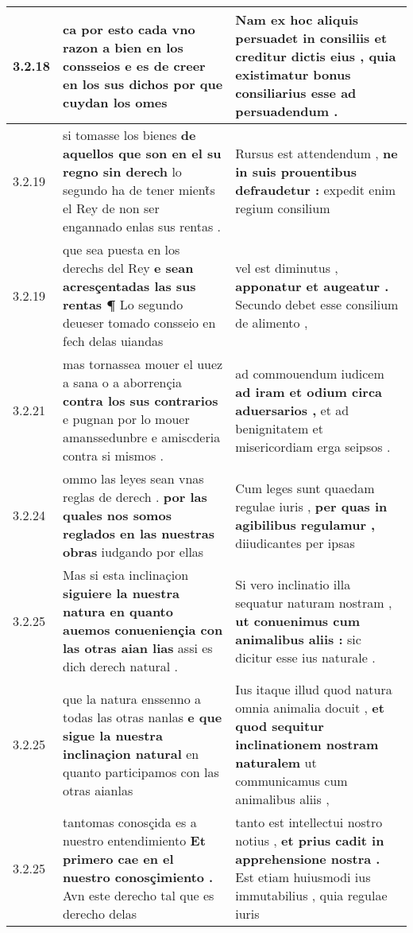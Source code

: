 \begin{tabular}{|p{1cm}|p{6.5cm}|p{6.5cm}|}
3.2.18 & ca por esto cada vno razon a bien en los consseios \textbf{ e es de creer en los sus dichos } por que cuydan los omes & Nam ex hoc aliquis persuadet in consiliis \textbf{ et creditur dictis eius , } quia existimatur bonus consiliarius esse ad persuadendum . \\\hline
3.2.19 & si tomasse los bienes \textbf{ de aquellos que son en el su regno sin derech } lo segundo ha de tener mient̃s el Rey de non ser engannado enlas sus rentas . & Rursus est attendendum , \textbf{ ne in suis prouentibus defraudetur : } expedit enim regium consilium \\\hline
3.2.19 & que sea puesta en los derechs del Rey \textbf{ e sean acresçentadas las sus rentas ¶ } Lo segundo deueser tomado consseio en fech delas uiandas & vel est diminutus , \textbf{ apponatur et augeatur . } Secundo debet esse consilium de alimento , \\\hline
3.2.21 & mas tornassea mouer el uuez a sana o a aborrençia \textbf{ contra los sus contrarios } e pugnan por lo mouer amanssedunbre e amiscderia contra si mismos . & ad commouendum iudicem \textbf{ ad iram et odium circa aduersarios , } et ad benignitatem et misericordiam erga seipsos . \\\hline
3.2.24 & ommo las leyes sean vnas reglas de derech . \textbf{ por las quales nos somos reglados en las nuestras obras } iudgando por ellas & Cum leges sunt quaedam regulae iuris , \textbf{ per quas in agibilibus regulamur , } diiudicantes per ipsas \\\hline
3.2.25 & Mas si esta inclinaçion \textbf{ siguiere la nuestra natura en quanto auemos conueniençia con las otras aian lias } assi es dich derech natural . & Si vero inclinatio illa sequatur naturam nostram , \textbf{ ut conuenimus cum animalibus aliis : } sic dicitur esse ius naturale . \\\hline
3.2.25 & que la natura enssenno a todas las otras nanlas \textbf{ e que sigue la nuestra inclinaçion natural } en quanto participamos con las otras aianlas & Ius itaque illud quod natura omnia animalia docuit , \textbf{ et quod sequitur inclinationem nostram naturalem } ut communicamus cum animalibus aliis , \\\hline
3.2.25 & tantomas conosçida es a nuestro entendimiento \textbf{ Et primero cae en el nuestro conosçimiento . } Avn este derecho tal que es derecho delas & tanto est intellectui nostro notius , \textbf{ et prius cadit in apprehensione nostra . } Est etiam huiusmodi ius immutabilius , quia regulae iuris \\\hline

\end{tabular}
